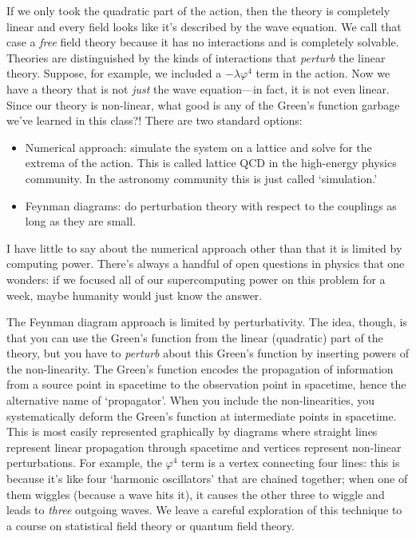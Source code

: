 If we only took the quadratic part of the action, then the theory is completely linear and every field looks like it's described by the wave equation. We call that case a \emph{free} field theory because it has no interactions and is completely solvable. Theories are distinguished by the kinds of interactions that \emph{perturb} the linear theory. Suppose, for example, we included a $-\lambda \varphi^4$ term in the action. Now we have a theory that is not \emph{just} the wave equation---in fact, it is not even linear. Since our theory is non-linear, what good is any of the Green's function garbage we've learned in this class?! There are two standard options:
\begin{itemize}
	\item Numerical approach: simulate the system on a lattice and solve for the extrema of the action. This is called lattice QCD in the high-energy physics community. In the astronomy community this is just called `simulation.' 
	\item Feynman diagrams: do perturbation theory with respect to the couplings as long as they are small. 
\end{itemize}
I have little to say about the numerical approach other than that it is limited by computing power. There's always a handful of open questions in physics that one wonders: if we focused all of our supercomputing power on this problem for a week, maybe humanity would just know the answer.

The Feynman diagram approach is limited by perturbativity. The idea, though, is that you can use the Green's function from the linear (quadratic) part of the theory, but you have to \emph{perturb} about this Green's function by inserting powers of the non-linearity. The Green's function encodes the propagation of information from a source point in spacetime to the observation point in spacetime, hence the alternative name of `propagator'. When you include the non-linearities, you systematically deform the Green's function at intermediate points in spacetime. This is most easily represented graphically by diagrams where straight lines represent linear propagation through spacetime and vertices represent non-linear perturbations. For example, the $\varphi^4$ term is a vertex connecting four lines: this is because it's like four `harmonic oscillators' that are chained together; when one of them wiggles (because a wave hits it), it causes the other three to wiggle and leads to \emph{three} outgoing waves. We leave a careful exploration of this technique to a course on statistical field theory or quantum field theory. 

